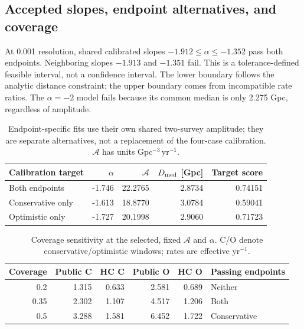 \subsection{Accepted slopes, endpoint alternatives, and coverage}
At 0.001 resolution, shared calibrated slopes $-1.912\le\alpha\le-1.352$ pass both endpoints. Neighboring slopes $-1.913$ and $-1.351$ fail. This is a tolerance-defined feasible interval, not a confidence interval. The lower boundary follows the analytic distance constraint; the upper boundary comes from incompatible rate ratios. The $\alpha=-2$ model fails because its common median is only 2.275 Gpc, regardless of amplitude.
\begin{table}[H]\centering\small
\renewcommand{\arraystretch}{1.15}
\caption{Endpoint-specific fits use their own shared two-survey amplitude; they are separate alternatives, not a replacement of the four-case calibration. $\mathcal A$ has units $\mathrm{Gpc^{-3}\,yr^{-1}}$.}
\begin{tabular}{@{}lrrrr@{}}
\toprule
Calibration target & $\alpha$ & $\mathcal A$ & $D_{\rm med}$ [Gpc] & Target score \\\midrule
Both endpoints & -1.746 & 22.2765 & 2.8734 & 0.74151 \\
Conservative only & -1.613 & 18.8770 & 3.0784 & 0.59041 \\
Optimistic only & -1.727 & 20.1998 & 2.9060 & 0.71723 \\
\bottomrule\end{tabular}\end{table}
\begin{table}[H]\centering\small
\renewcommand{\arraystretch}{1.15}
\caption{Coverage sensitivity at the selected, fixed $\mathcal A$ and $\alpha$. C/O denote conservative/optimistic windows; rates are effective $\mathrm{yr^{-1}}$.}
\begin{tabular}{@{}rrrrrl@{}}
\toprule
Coverage & Public C & HC C & Public O & HC O & Passing endpoints \\\midrule
0.2 & 1.315 & 0.633 & 2.581 & 0.689 & Neither \\
0.35 & 2.302 & 1.107 & 4.517 & 1.206 & Both \\
0.5 & 3.288 & 1.581 & 6.452 & 1.722 & Conservative \\
\bottomrule\end{tabular}\end{table}


